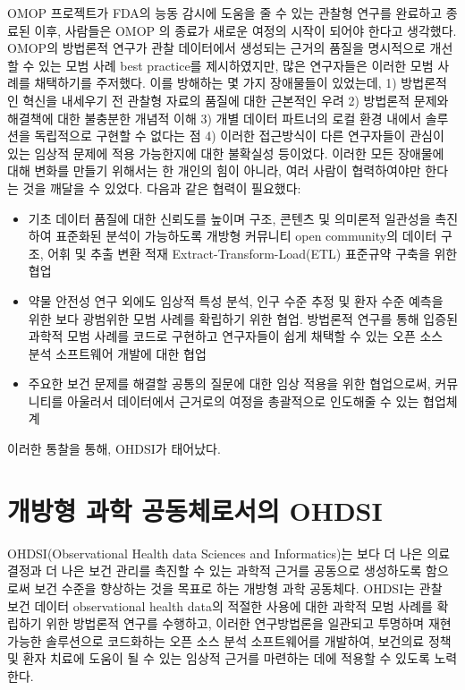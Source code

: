 \documentclass[10.5pt]{book}
\providecommand{\tightlist}{%
  \setlength{\itemsep}{0pt}\setlength{\parskip}{0pt}}
\theoremstyle{definition}
\theoremstyle{definition}
\theoremstyle{definition}
\theoremstyle{remark}
\begin{document}
OMOP 프로젝트가 FDA의 능동 감시에 도움을 줄 수 있는 관찰형 연구를
완료하고 종료된 이후, 사람들은 OMOP 의 종료가 새로운 여정의 시작이
되어야 한다고 생각했다. OMOP의 방법론적 연구가 관찰 데이터에서 생성되는
근거의 품질을 명시적으로 개선할 수 있는 모범 사례 best practice를
제시하였지만, 많은 연구자들은 이러한 모범 사례를 채택하기를 주저했다.
이를 방해하는 몇 가지 장애물들이 있었는데, 1) 방법론적인 혁신을 내세우기
전 관찰형 자료의 품질에 대한 근본적인 우려 2) 방법론적 문제와 해결책에
대한 불충분한 개념적 이해 3) 개별 데이터 파트너의 로컬 환경 내에서
솔루션을 독립적으로 구현할 수 없다는 점 4) 이러한 접근방식이 다른
연구자들이 관심이 있는 임상적 문제에 적용 가능한지에 대한 불확실성
등이었다. 이러한 모든 장애물에 대해 변화를 만들기 위해서는 한 개인의
힘이 아니라, 여러 사람이 협력하여야만 한다는 것을 깨달을 수 있었다.
다음과 같은 협력이 필요했다:

\begin{itemize}
\tightlist
\item
  기초 데이터 품질에 대한 신뢰도를 높이며 구조, 콘텐츠 및 의미론적
  일관성을 촉진하여 표준화된 분석이 가능하도록 개방형 커뮤니티 open
  community의 데이터 구조, 어휘 및 추출 변환 적재
  Extract-Transform-Load(ETL) 표준규약 구축을 위한 협업
\item
  약물 안전성 연구 외에도 임상적 특성 분석, 인구 수준 추정 및 환자 수준
  예측을 위한 보다 광범위한 모범 사례를 확립하기 위한 협업. 방법론적
  연구를 통해 입증된 과학적 모범 사례를 코드로 구현하고 연구자들이 쉽게
  채택할 수 있는 오픈 소스 분석 소프트웨어 개발에 대한 협업
\item
  주요한 보건 문제를 해결할 공통의 질문에 대한 임상 적용을 위한
  협업으로써, 커뮤니티를 아울러서 데이터에서 근거로의 여정을 총괄적으로
  인도해줄 수 있는 협업체계
\end{itemize}

이러한 통찰을 통해, OHDSI가 태어났다.

\section{개방형 과학 공동체로서의 OHDSI}\label{---ohdsi}

OHDSI(Observational Health data Sciences and Informatics)는 보다 더 나은
의료 결정과 더 나은 보건 관리를 촉진할 수 있는 과학적 근거를 공동으로
생성하도록 함으로써 보건 수준을 향상하는 것을 목표로 하는 개방형 과학
공동체다. \citep{Hripcsak2015} OHDSI는 관찰 보건 데이터 observational
health data의 적절한 사용에 대한 과학적 모범 사례를 확립하기 위한
방법론적 연구를 수행하고, 이러한 연구방법론을 일관되고 투명하며 재현
가능한 솔루션으로 코드화하는 오픈 소스 분석 소프트웨어를 개발하여,
보건의료 정책 및 환자 치료에 도움이 될 수 있는 임상적 근거를 마련하는
데에 적용할 수 있도록 노력한다.
\end{document}
